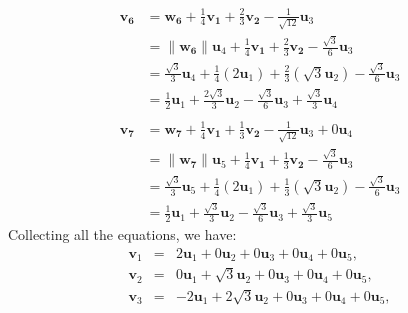\documentclass[12pt]{article}
\begin{document}
\begin{enumerate}
\begin{enumerate}
\begin{align*}
                        \\
                        \mathbf{v_6} & = \mathbf{w_6} + \tfrac{1}{4}\mathbf{v_1} + \tfrac{2}{3}\mathbf{v_2} - \tfrac{1}{\sqrt{12}}\mathbf{u}_3                                \\
                                     & = \|\mathbf{w_6}\|\mathbf{u}_4 + \tfrac{1}{4}\mathbf{v_1} + \tfrac{2}{3}\mathbf{v_2} - \tfrac{\sqrt{3}}{6}\mathbf{u}_3                 \\
                                     & = \tfrac{\sqrt{3}}{3}\mathbf{u}_4 + \tfrac{1}{4}(2\mathbf{u}_1) + \tfrac{2}{3}(\sqrt{3}\mathbf{u}_2) - \tfrac{\sqrt{3}}{6}\mathbf{u}_3 \\
                                     & = \tfrac{1}{2}\mathbf{u}_1 + \tfrac{2\sqrt{3}}{3}\mathbf{u}_2 - \tfrac{\sqrt{3}}{6}\mathbf{u}_3 + \tfrac{\sqrt{3}}{3}\mathbf{u}_4      \\
                        \\
                        \mathbf{v_7} & = \mathbf{w_7} + \tfrac{1}{4}\mathbf{v_1} + \tfrac{1}{3}\mathbf{v_2} - \tfrac{1}{\sqrt{12}}\mathbf{u}_3 + 0\mathbf{u}_4                \\
                                     & = \|\mathbf{w_7}\|\mathbf{u}_5 + \tfrac{1}{4}\mathbf{v_1} + \tfrac{1}{3}\mathbf{v_2} - \tfrac{\sqrt{3}}{6}\mathbf{u}_3                 \\
                                     & = \tfrac{\sqrt{3}}{3}\mathbf{u}_5 + \tfrac{1}{4}(2\mathbf{u}_1) + \tfrac{1}{3}(\sqrt{3}\mathbf{u}_2) - \tfrac{\sqrt{3}}{6}\mathbf{u}_3 \\
                                     & = \tfrac{1}{2}\mathbf{u}_1 + \tfrac{\sqrt{3}}{3}\mathbf{u}_2 - \tfrac{\sqrt{3}}{6}\mathbf{u}_3 + \tfrac{\sqrt{3}}{3}\mathbf{u}_5
                    \end{align*}
                    Collecting all the equations, we have:
                    \[
                        \begin{array}{rcl}
                            \mathbf{v}_1 & = & 2\mathbf{u}_1 + 0\mathbf{u}_2 + 0\mathbf{u}_3 + 0\mathbf{u}_4 + 0\mathbf{u}_5,                                                                   \\[6pt]
                            \mathbf{v}_2 & = & 0\mathbf{u}_1 + \sqrt{3}\mathbf{u}_2 + 0\mathbf{u}_3 + 0\mathbf{u}_4 + 0\mathbf{u}_5,                                                            \\[6pt]
                            \mathbf{v}_3 & = & -2\mathbf{u}_1 + 2\sqrt{3}\mathbf{u}_2 + 0\mathbf{u}_3 + 0\mathbf{u}_4 + 0\mathbf{u}_5,                                                          \\[6pt]

\end{array}\]
\end{enumerate}
\end{enumerate}
\end{document}
